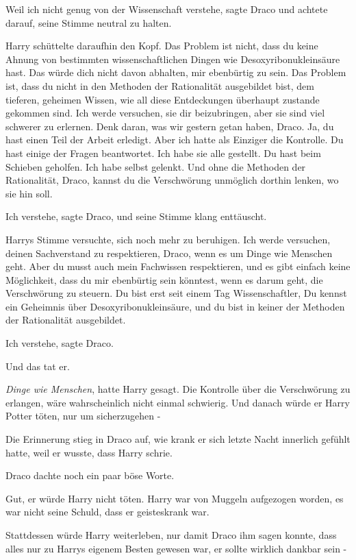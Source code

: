 \glqq{}Weil ich nicht genug von der Wissenschaft verstehe\grqq{}, sagte Draco
und achtete darauf, seine Stimme neutral zu halten.

Harry schüttelte daraufhin den Kopf. \glqq{}Das Problem ist nicht, dass du keine
Ahnung von bestimmten wissenschaftlichen Dingen wie Desoxyribonukleinsäure hast.
Das würde dich nicht davon abhalten, mir ebenbürtig zu sein. Das Problem ist,
dass du nicht in den Methoden der Rationalität ausgebildet bist, dem tieferen,
geheimen Wissen, wie all diese Entdeckungen überhaupt zustande gekommen sind.
Ich werde versuchen, sie dir beizubringen, aber sie sind viel schwerer zu
erlernen. Denk daran, was wir gestern getan haben, Draco. Ja, du hast einen Teil
der Arbeit erledigt. Aber ich hatte als Einziger die Kontrolle. Du hast einige
der Fragen beantwortet. Ich habe sie alle gestellt. Du hast beim Schieben
geholfen. Ich habe selbst gelenkt. Und ohne die Methoden der Rationalität,
Draco, kannst du die Verschwörung unmöglich dorthin lenken, wo sie hin
soll.\grqq{}

\glqq{}Ich verstehe\grqq{}, sagte Draco, und seine Stimme klang enttäuscht.

Harrys Stimme versuchte, sich noch mehr zu beruhigen. \glqq{}Ich werde
versuchen, deinen Sachverstand zu respektieren, Draco, wenn es um Dinge wie
Menschen geht. Aber du musst auch mein Fachwissen respektieren, und es gibt
einfach keine Möglichkeit, dass du mir ebenbürtig sein könntest, wenn es darum
geht, die Verschwörung zu steuern. Du bist erst seit einem Tag Wissenschaftler,
Du kennst ein Geheimnis über Desoxyribonukleinsäure, und du bist in keiner der
Methoden der Rationalität ausgebildet.\grqq{}

\glqq{}Ich verstehe\grqq{}, sagte Draco.

Und das tat er.

\emph{Dinge wie Menschen}, hatte Harry gesagt. Die Kontrolle über die
Verschwörung zu erlangen, wäre wahrscheinlich nicht einmal schwierig. Und danach
würde er Harry Potter töten, nur um sicherzugehen -

Die Erinnerung stieg in Draco auf, wie krank er sich letzte Nacht innerlich
gefühlt hatte, weil er wusste, dass Harry schrie.

Draco dachte noch ein paar böse Worte.

Gut, er würde Harry nicht töten. Harry war von Muggeln aufgezogen worden, es war
nicht seine Schuld, dass er geisteskrank war.

Stattdessen würde Harry weiterleben, nur damit Draco ihm sagen konnte, dass
alles nur zu Harrys eigenem Besten gewesen war, er sollte wirklich dankbar sein
-

